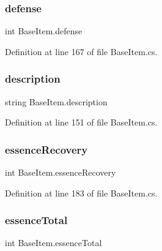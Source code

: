 \subsubsection{\texorpdfstring{defense}{defense}}
{\footnotesize\ttfamily int Base\+Item.\+defense\hspace{0.3cm}{\ttfamily [get]}}



Definition at line 167 of file Base\+Item.\+cs.

\mbox{\label{class_base_item_a68d3b7881ba8985bf1094ed0f7c30560}} 
\subsubsection{\texorpdfstring{description}{description}}
{\footnotesize\ttfamily string Base\+Item.\+description\hspace{0.3cm}{\ttfamily [get]}}



Definition at line 151 of file Base\+Item.\+cs.

\mbox{\label{class_base_item_a47d64c0e1e672c7e26191d82ecb1c639}} 
\subsubsection{\texorpdfstring{essenceRecovery}{essenceRecovery}}
{\footnotesize\ttfamily int Base\+Item.\+essence\+Recovery\hspace{0.3cm}{\ttfamily [get]}}



Definition at line 183 of file Base\+Item.\+cs.

\mbox{\label{class_base_item_a6f4e6b8312eda49aac9073e42ee19032}} 
\subsubsection{\texorpdfstring{essenceTotal}{essenceTotal}}
{\footnotesize\ttfamily int Base\+Item.\+essence\+Total\hspace{0.3cm}{\ttfamily [get]}}



